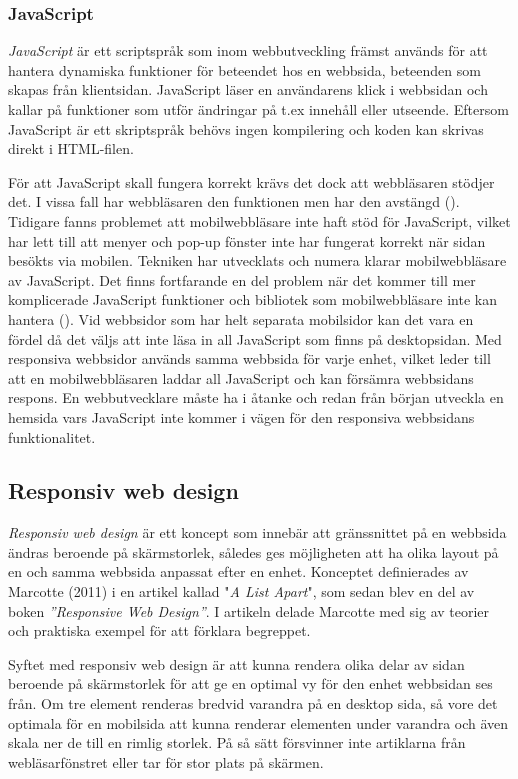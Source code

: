\documentclass[11pt]{article}
\begin{document}
\subsubsection{JavaScript}
\textit{JavaScript} är ett scriptspråk som inom webbutveckling främst används för att hantera dynamiska funktioner för beteendet hos en webbsida, beteenden som skapas från klientsidan. JavaScript läser en användarens klick i webbsidan och kallar på funktioner som utför ändringar på t.ex innehåll eller utseende. Eftersom JavaScript är ett skriptspråk behövs ingen kompilering och koden kan skrivas direkt i HTML-filen.

För att JavaScript skall fungera korrekt krävs det dock att webbläsaren stödjer det. I vissa fall har webbläsaren den funktionen men har den avstängd (\cite[s.13]{sara_ingmar}). Tidigare fanns problemet att mobilwebbläsare inte haft stöd för JavaScript, vilket har lett till att menyer och pop-up fönster inte har fungerat korrekt när sidan besökts via mobilen. Tekniken har utvecklats och numera klarar mobilwebbläsare av JavaScript. Det finns fortfarande en del problem när det kommer till mer komplicerade JavaScript funktioner och bibliotek som mobilwebbläsare inte kan hantera (\cite{quirksmode}). Vid webbsidor som har helt separata mobilsidor kan det vara en fördel då det väljs att inte läsa in all JavaScript som finns på desktopsidan. Med responsiva webbsidor används samma webbsida för varje enhet, vilket leder till att en mobilwebbläsaren laddar all JavaScript och kan försämra webbsidans respons. En webbutvecklare måste ha i åtanke och redan från början utveckla en hemsida vars JavaScript inte kommer i vägen för den responsiva webbsidans funktionalitet.
\newpage
\subsection{Responsiv web design}
\textit{Responsiv web design} är ett koncept som innebär att gränssnittet på en webbsida ändras beroende på skärmstorlek, således ges möjligheten att ha olika layout på en och samma webbsida anpassat efter en enhet. Konceptet definierades av Marcotte (2011) i en artikel kallad "\textit{A List Apart}", som sedan blev en del av boken \textit{”Responsive Web Design”}. I artikeln delade Marcotte med sig av teorier och praktiska exempel för att förklara begreppet. 

Syftet med responsiv web design är att kunna rendera olika delar av sidan beroende på skärmstorlek för att ge en optimal vy för den enhet webbsidan ses från. Om tre element renderas bredvid varandra på en desktop sida, så vore det optimala för en mobilsida att kunna renderar elementen under varandra och även skala ner de till en rimlig storlek. På så sätt försvinner inte artiklarna från webläsarfönstret eller tar för stor plats på skärmen.
\end{document}
